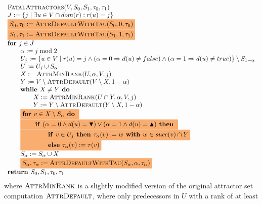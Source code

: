 \documentclass{article}
\newcommand{\If}{\text{\textbf{if }}}
\newcommand{\Do}{\text{\textbf{ do }}}
\newcommand{\Then}{\text{\textbf{ then }}}
\newcommand{\Else}{\text{\textbf{else }}}
\newcommand{\For}{\text{\textbf{for }}}
\newcommand{\While}{\text{\textbf{while }}}
\newcommand{\Return}{\text{\textbf{return }}}
\begin{document}
\begin{equation*}
\begin{array}{l}
\text{\textsc{FatalAttractors}}(V, S_0, S_1, \tau_0, \tau_1)\\
J := \{ j \mid \exists u \in V \cap dom(r) : r(u) = j \} \\
\colorbox{Apricot}{$S_0, \tau_0 := \textsc{AttrDefaultWithTau}(S_0, 0, \tau_0)$} \\
\colorbox{Apricot}{$S_1, \tau_1 := \textsc{AttrDefaultWithTau}(S_1, 1, \tau_1)$} \\
\textbf{for } j \in J \\
\qquad \alpha := j \bmod 2\\
\qquad U_j := \{u \in V \mid r(u) = j \wedge (\alpha = 0 \Rightarrow d(u) \neq false) 
\wedge (\alpha = 1 \Rightarrow d(u) \neq true) \} \setminus S_{1 - \alpha} \\
\qquad U := U_j \cup S_\alpha\\
\qquad X := \textsc{AttrMinRank}(U, \alpha, V, j) \\
\qquad Y := V \setminus \textsc{AttrDefault}(V \setminus X, 1-\alpha) \\
\qquad \While X \neq Y \textbf{ do }\\
\qquad \qquad X := \textsc{AttrMinRank}(U \cap Y, \alpha, V, j) \\
\qquad \qquad Y := Y \setminus \textsc{AttrDefault}(Y \setminus X, 1-\alpha) \\
\qquad \colorbox{Apricot}{$ \For v \in X \setminus S_{\alpha} \Do $} \\
\qquad \colorbox{Apricot}{$ \qquad \If (\alpha = 0 \land d(u) = \blacktriangledown) \lor (\alpha = 1 \land d(u) = \blacktriangle) \Then $} \\
\qquad \colorbox{Apricot}{$ \qquad \qquad \If v \in U_j \Then \tau_{\alpha}(v) := w \textbf{ with } w \in succ(v) \cap Y $} \\
\qquad \colorbox{Apricot}{$ \qquad \qquad \Else \tau_{\alpha}(v) := \tau(v)$} \\
\qquad S_\alpha := S_\alpha \cup X \\
\qquad \colorbox{Apricot}{$ S_\alpha, \tau_\alpha := \textsc{AttrDefaultWithTau}(S_\alpha, \alpha, \tau_\alpha)$} \\
\Return S_0, S_1, \tau_0,\tau_1
\end{array}
\end{equation*}
where $\textsc{AttrMinRank}$ is a slightly modified version of the original attractor
set computation $\textsc{AttrDefault}$, where only predecessors in $U$ with a rank of at least
\end{document}
